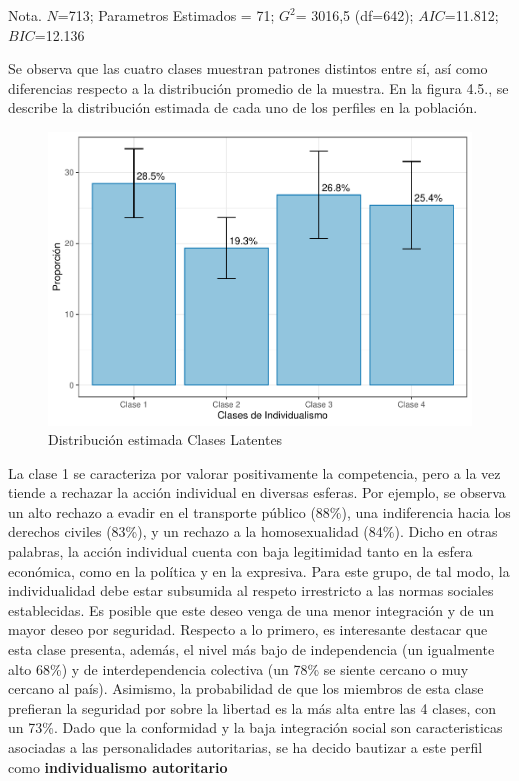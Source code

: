 \documentclass[12pt,twoside]{templates/facsothesis}
\begin{document}
Nota. \(N\)=713; Parametros Estimados = 71; \(G^2\)= 3016,5 (df=642); \(AIC\)=11.812; \(BIC\)=12.136

Se observa que las cuatro clases muestran patrones distintos entre sí, así como diferencias respecto a la distribución promedio de la muestra. En la figura 4.5., se describe la distribución estimada de cada uno de los perfiles en la población.

\begin{figure}[!ht]

{\centering \includegraphics[width=1\linewidth,]{tesis_files/figure-latex/unnamed-chunk-8-1} 

}

\caption{Distribución estimada Clases Latentes}\label{fig:unnamed-chunk-8}
\end{figure}
\FloatBarrier

La clase 1 se caracteriza por valorar positivamente la competencia, pero a la vez tiende a rechazar la acción individual en diversas esferas. Por ejemplo, se observa un alto rechazo a evadir en el transporte público (88\%), una indiferencia hacia los derechos civiles (83\%), y un rechazo a la homosexualidad (84\%). Dicho en otras palabras, la acción individual cuenta con baja legitimidad tanto en la esfera económica, como en la política y en la expresiva. Para este grupo, de tal modo, la individualidad debe estar subsumida al respeto irrestricto a las normas sociales establecidas. Es posible que este deseo venga de una menor integración y de un mayor deseo por seguridad. Respecto a lo primero, es interesante destacar que esta clase presenta, además, el nivel más bajo de independencia (un igualmente alto 68\%) y de interdependencia colectiva (un 78\% se siente cercano o muy cercano al país). Asimismo, la probabilidad de que los miembros de esta clase prefieran la seguridad por sobre la libertad es la más alta entre las 4 clases, con un 73\%. Dado que la conformidad \citep{zakrisson2005} y la baja integración social \citep{gidron2020} son caracteristicas asociadas a las personalidades autoritarias, se ha decido bautizar a este perfil como \textbf{individualismo autoritario}
\end{document}
